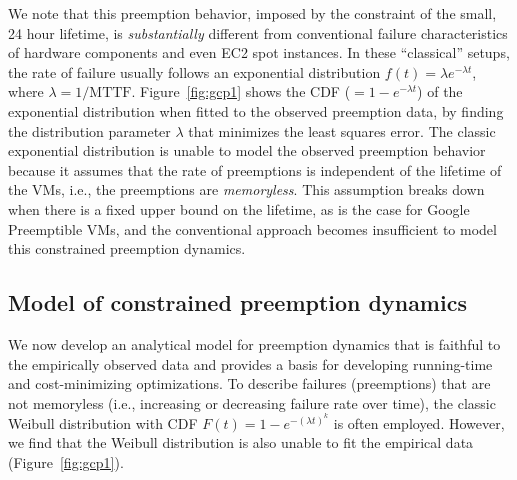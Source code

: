 We note that this preemption behavior, imposed by the constraint of the small, 24 hour  lifetime, is \emph{substantially} different from conventional failure characteristics of hardware components and even EC2 spot instances.
In these ``classical'' setups, the rate of failure  usually follows an exponential distribution $f(t) = \lambda e^{-\lambda t}$, where $\lambda=1/\text{MTTF}$.
Figure~\ref{fig:gcp1} shows the CDF ($=1-e^{-\lambda t}$) of the exponential distribution when fitted to the observed preemption data, by finding the distribution parameter $\lambda$ that minimizes the least squares error.
The classic exponential distribution is unable to model the observed preemption behavior because it assumes that the rate of preemptions is independent of the lifetime of the VMs, i.e., the preemptions are \emph{memoryless}.
This assumption breaks down when there is a fixed upper bound on the lifetime, as is the case for Google Preemptible VMs, and the conventional approach becomes insufficient to model this constrained preemption dynamics. 

\subsection{Model of constrained preemption dynamics}
\label{subsec:analytical-model}

We now develop an analytical model for preemption dynamics that is faithful to the empirically observed data and provides a basis for developing running-time and cost-minimizing optimizations. %
%
To describe failures (preemptions) that are not memoryless (i.e., increasing or decreasing failure rate over time), the classic Weibull distribution with CDF $F(t)=1-e^{-(\lambda t)^k}$ is often employed. However, we find that the Weibull distribution is also unable to fit the empirical data (Figure~\ref{fig:gcp1}). 

